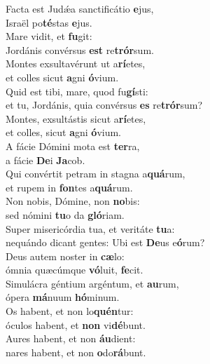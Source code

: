 \evenverse Facta est Judǽa sanctificátio \textbf{e}jus,~\*\\
\evenverse Israël po\textbf{té}stas \textbf{e}jus.\\
\oddverse Mare vidit, et \textbf{fu}git:~\*\\
\oddverse Jordánis convérsus \textbf{est} re\textbf{trór}sum.\\
\evenverse Montes exsultavérunt ut a\textbf{rí}etes,~\*\\
\evenverse et colles sicut \textbf{a}gni \textbf{ó}vium.\\
\oddverse Quid est tibi, mare, quod fu\textbf{gí}sti:~\*\\
\oddverse et tu, Jordánis, quia convérsus \textbf{es} re\textbf{trór}sum?\\
\evenverse Montes, exsultástis sicut a\textbf{rí}etes,~\*\\
\evenverse et colles, sicut \textbf{a}gni \textbf{ó}vium.\\
\oddverse A fácie Dómini mota est \textbf{ter}ra,~\*\\
\oddverse a fácie \textbf{De}i \textbf{Ja}cob.\\
\evenverse Qui convértit petram in stagna a\textbf{quá}rum,~\*\\
\evenverse et rupem in \textbf{fon}tes a\textbf{quá}rum.\\
\oddverse Non nobis, Dómine, non \textbf{no}bis:~\*\\
\oddverse sed nómini \textbf{tu}o da \textbf{gló}riam.\\
\evenverse Super misericórdia tua, et veritáte \textbf{tu}a:~\*\\
\evenverse nequándo dicant gentes: Ubi est \textbf{De}us e\textbf{ó}rum?\\
\oddverse Deus autem noster in \textbf{cæ}lo:~\*\\
\oddverse ómnia quæcúmque \textbf{vó}luit, \textbf{fe}cit.\\
\evenverse Simulácra géntium argéntum, et \textbf{au}rum,~\*\\
\evenverse ópera \textbf{má}nuum \textbf{hó}minum.\\
\oddverse Os habent, et non lo\textbf{quén}tur:~\*\\
\oddverse óculos habent, et \textbf{non} vi\textbf{dé}bunt.\\
\evenverse Aures habent, et non \textbf{áu}dient:~\*\\
\evenverse nares habent, et non \textbf{o}do\textbf{rá}bunt.\\
